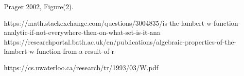 %
Prager 2002, Figure(2).



https://math.stackexchange.com/questions/3004835/is-the-lambert-w-function-analytic-if-not-everywhere-then-on-what-set-is-it-ana
https://researchportal.bath.ac.uk/en/publications/algebraic-properties-of-the-lambert-w-function-from-a-result-of-r

%
https://cs.uwaterloo.ca/research/tr/1993/03/W.pdf

%








